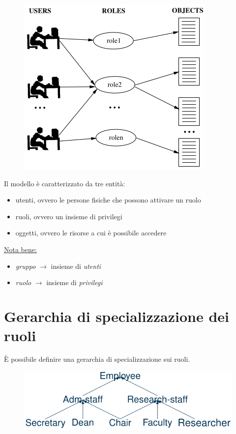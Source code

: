 \documentclass{report}
\begin{document}
\begin{figure}[H]
    \centering
    \includegraphics[width=0.5\linewidth]{images/rbac.png}
\end{figure}

\noindent Il modello è caratterizzato da tre entità:
\begin{itemize}
    \item utenti, ovvero le persone fisiche che possono attivare un ruolo 
    \item ruoli, ovvero un insieme di privilegi
    \item oggetti, ovvero le risorse a cui è possibile accedere
\end{itemize}

\noindent \underline{Nota bene:}
\begin{itemize}
    \item \textit{gruppo} $\rightarrow$ insieme di \textit{utenti}
    \item \textit{ruolo} $\rightarrow$ insieme di \textit{privilegi}
\end{itemize}

\section{Gerarchia di specializzazione dei ruoli}

È possibile definire una gerarchia di specializzazione sui ruoli.

\begin{figure}[H]
    \centering
    \includegraphics[width=0.8\linewidth]{images/ger-ruoli.png}
\end{figure}
\end{document}
